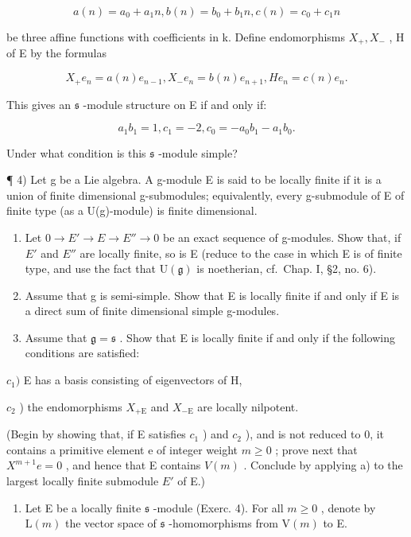 \[
a (n) = a _ {0} + a _ {1} n, b (n) = b _ {0} + b _ {1} n, c (n) = c _ {0} + c _ {1} n
\]

be three affine functions with coefficients in k. Define endomorphisms \(X_{+}, X_{-}\) , H of E by the formulas

\[
X _ {+} e _ {n} = a (n) e _ {n - 1}, X _ {-} e _ {n} = b (n) e _ {n + 1}, H e _ {n} = c (n) e _ {n}.
\]

This gives an \(\mathfrak{s}\) -module structure on E if and only if:

\[
a _ {1} b _ {1} = 1, c _ {1} = - 2, c _ {0} = - a _ {0} b _ {1} - a _ {1} b _ {0}.
\]

Under what condition is this \(\mathfrak{s}\) -module simple?

¶ 4) Let g be a Lie algebra. A g-module E is said to be locally finite if it is a union of finite dimensional g-submodules; equivalently, every g-submodule of E of finite type (as a U(g)-module) is finite dimensional.

\begin{enumerate}
\def\labelenumi{\alph{enumi})}
\item
  Let \(0 \rightarrow E' \rightarrow E \rightarrow E'' \rightarrow 0\) be an exact sequence of g-modules. Show that, if \(E'\) and \(E''\) are locally finite, so is E (reduce to the case in which E is of finite type, and use the fact that \(\mathrm{U}(\mathfrak{g})\) is noetherian, cf.~Chap. I, §2, no. 6).
\item
  Assume that g is semi-simple. Show that E is locally finite if and only if E is a direct sum of finite dimensional simple g-modules.
\item
  Assume that \(\mathfrak{g} = \mathfrak{s}\) . Show that E is locally finite if and only if the following conditions are satisfied:
\end{enumerate}

\(c_{1})\) E has a basis consisting of eigenvectors of H,

\(c_{2}\) ) the endomorphisms \(X_{+\mathrm{E}}\) and \(X_{-\mathrm{E}}\) are locally nilpotent.

(Begin by showing that, if E satisfies \(c_{1}\) ) and \(c_{2}\) ), and is not reduced to 0, it contains a primitive element e of integer weight \(m \geq 0\) ; prove next that \(X^{m+1}e = 0\) , and hence that E contains \(V(m)\) . Conclude by applying a) to the largest locally finite submodule \(E'\) of E.)

\begin{enumerate}
\def\labelenumi{\arabic{enumi})}
\setcounter{enumi}{4}
\tightlist
\item
  Let E be a locally finite \(\mathfrak{s}\) -module (Exerc. 4). For all \(m \geq 0\) , denote by \(\mathrm{L}(m)\) the vector space of \(\mathfrak{s}\) -homomorphisms from \(\mathrm{V}(m)\) to E.
\end{enumerate}

